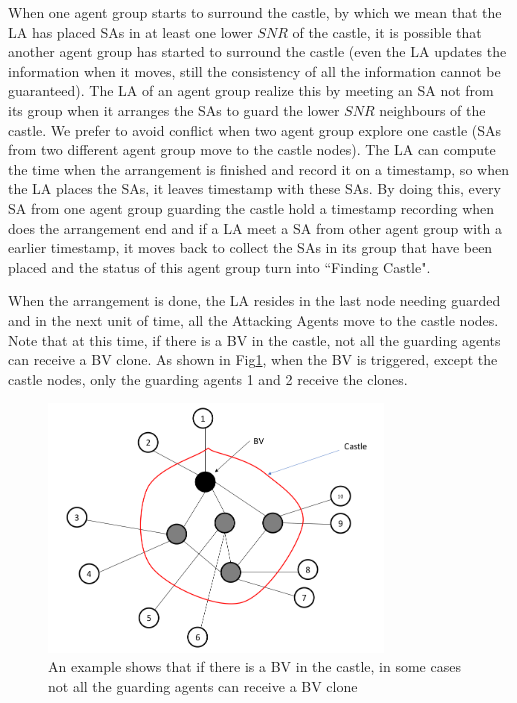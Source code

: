 When one agent group starts to surround the castle, by which we mean that the LA has placed SAs in at least one lower $SNR$ of the castle, it is possible that another agent group has started to surround the castle (even the LA updates the information when it moves, still the consistency of all the information cannot be guaranteed). The LA of an agent group realize this by meeting an SA not from its group when it arranges the SAs to guard the lower $SNR$ neighbours of the castle. We prefer to avoid conflict when two agent group explore one castle (SAs from two different agent group move to the castle nodes). The LA can compute the time when the arrangement is finished and record it on a timestamp, so when the LA places the SAs, it leaves timestamp with these SAs. By doing this, every SA from one agent group guarding the castle hold a timestamp recording when does the arrangement end and if a LA meet a SA from other agent group with a earlier timestamp, it moves back to collect the SAs in its group that have been placed and the status of this agent group turn into ``Finding Castle". 

When the arrangement is done, the LA resides in the last node needing guarded and in the next unit of time, all the Attacking Agents move to the castle nodes. Note that at this time, if there is a BV in the castle, not all the guarding agents can receive a BV clone. As shown in Fig\ref{fig:MultiCastleNode}, when the BV is triggered, except the castle nodes, only the guarding agents 1 and 2 receive the clones.
\begin{figure}[H]
\centering  
\includegraphics[width=3.5in]{figures/MultiCastleNode.png}
\caption{An example shows that if there is a BV in the castle, in some cases not all the guarding agents can receive a BV clone}\label{fig:MultiCastleNode}
\end{figure} 

